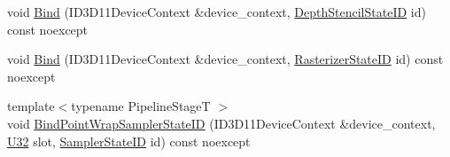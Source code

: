 \begin{DoxyCompactItemize}
\item 
void \hyperlink{classmage_1_1rendering_1_1_state_manager_a0ae3054764b68d9e9c89c403b57b52b3}{Bind} (I\+D3\+D11\+Device\+Context \&device\+\_\+context, \hyperlink{namespacemage_1_1rendering_ace195e7a068336e477080fce30f1329e}{Depth\+Stencil\+State\+ID} id) const noexcept
\item 
void \hyperlink{classmage_1_1rendering_1_1_state_manager_a4b3f51dfa639bdb218e9103df4342638}{Bind} (I\+D3\+D11\+Device\+Context \&device\+\_\+context, \hyperlink{namespacemage_1_1rendering_ac878731f5dc22a3a36ccfbfc77c3faca}{Rasterizer\+State\+ID} id) const noexcept
\item 
{\footnotesize template$<$typename Pipeline\+StageT $>$ }\\void \hyperlink{classmage_1_1rendering_1_1_state_manager_a6771451495ed6d83c76e6f008b2d7c17}{Bind\+Point\+Wrap\+Sampler\+State\+ID} (I\+D3\+D11\+Device\+Context \&device\+\_\+context, \hyperlink{namespacemage_a41c104c036fba3756a74e19f793eeaa1}{U32} slot, \hyperlink{namespacemage_1_1rendering_a6f80181126db61dbb8b528a6894eb658}{Sampler\+State\+ID} id) const noexcept
\end{DoxyCompactItemize}
